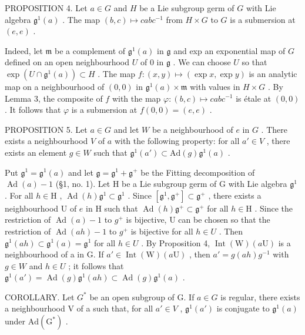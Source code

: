 PROPOSITION 4. Let \(a \in G\) and \(H\) be a Lie subgroup germ of \(G\) with Lie algebra \(\mathfrak{g}^1(a)\) . The map \((b, c) \mapsto cabc^{-1}\) from \(H \times G\) to \(G\) is a submersion at \((e, e)\) .

Indeed, let \(\mathfrak{m}\) be a complement of \(\mathfrak{g}^1(a)\) in \(\mathfrak{g}\) and exp an exponential map of \(G\) defined on an open neighbourhood \(U\) of \(0\) in \(\mathfrak{g}\) . We can choose \(U\) so that \(\exp(U \cap \mathfrak{g}^1(a)) \subset H\) . The map \(f: (x, y) \mapsto (\exp x, \exp y)\) is an analytic map on a neighbourhood of \((0, 0)\) in \(\mathfrak{g}^1(a) \times \mathfrak{m}\) with values in \(H \times G\) . By Lemma 3, the composite of \(f\) with the map \(\varphi: (b, c) \mapsto cabc^{-1}\) is étale at \((0, 0)\) . It follows that \(\varphi\) is a submersion at \(f(0, 0) = (e, e)\) .

PROPOSITION 5. Let \(a \in G\) and let \(W\) be a neighbourhood of \(e\) in \(G\) . There exists a neighbourhood \(V\) of \(a\) with the following property: for all \(a' \in V\) , there exists an element \(g \in W\) such that \(\mathfrak{g}^1(a') \subset \mathrm{Ad}(g)\mathfrak{g}^1(a)\) .

Put \(\mathfrak{g}^1 = \mathfrak{g}^1(a)\) and let \(\mathfrak{g} = \mathfrak{g}^1 + \mathfrak{g}^+\) be the Fitting decomposition of \(\operatorname{Ad}(a) - 1\) (§1, no. 1). Let H be a Lie subgroup germ of G with Lie algebra \(\mathfrak{g}^1\) . For all \(h \in \mathrm{H}\) , \(\operatorname{Ad}(h)\mathfrak{g}^1 \subset \mathfrak{g}^1\) . Since \([\mathfrak{g}^1, \mathfrak{g}^+] \subset \mathfrak{g}^+\) , there exists a neighbourhood U of \(e\) in H such that \(\operatorname{Ad}(h)\mathfrak{g}^+ \subset \mathfrak{g}^+\) for all \(h \in \mathrm{H}\) . Since the restriction of \(\operatorname{Ad}(a)-1\) to \(g^{+}\) is bijective, U can be chosen so that the restriction of \(\operatorname{Ad}(ah)-1\) to \(g^{+}\) is bijective for all \(h\in U\) . Then \(\mathfrak{g}^{1}(ah)\subset\mathfrak{g}^{1}(a)=\mathfrak{g}^{1}\) for all \(h\in U\) . By Proposition 4, \(\operatorname{Int}(\mathrm{W})(a\mathrm{U})\) is a neighbourhood of a in G. If \(a'\in\operatorname{Int}(\mathrm{W})(a\mathrm{U})\) , then \(a'=g(ah)g^{-1}\) with \(g\in W\) and \(h\in U\) ; it follows that \(\mathfrak{g}^{1}(a')=\operatorname{Ad}(g)\mathfrak{g}^{1}(ah)\subset\operatorname{Ad}(g)\mathfrak{g}^{1}(a)\) .

COROLLARY. Let \(G^{*}\) be an open subgroup of G. If \(a \in G\) is regular, there exists a neighbourhood V of a such that, for all \(a' \in V\) , \(\mathfrak{g}^{1}(a')\) is conjugate to \(\mathfrak{g}^{1}(a)\) under \(\mathrm{Ad}(\mathrm{G}^{*})\) .

